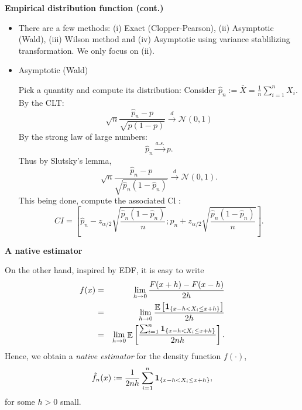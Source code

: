 \documentclass[19pt,landscaoe]{article}
\newcommand{\bone}{{\bf 1}}
\DeclareMathOperator{\E}{\mathbb{E}}
\begin{document}
\newpage
{\LARGE\centerline{\textbf{Empirical distribution function (cont.)}}}
\vskip25pt
    \large 
   
    
    \begin{itemize}
      \item
    There are a few methods: (i) Exact (Clopper-Pearson),
      (ii) Asymptotic (Wald), (iii)  Wilson method and (iv) Asymptotic using variance stablilizing transformation. We only focus on (ii).
    
    \item Asymptotic (Wald)
    
     Pick a quantity and compute its distribution: Consider $\hat{p}_{n}:=\bar{X}=\frac1n\sum_{i=1}^nX_i$. By the CLT:
    $$
    \sqrt{n} \frac{\hat{p}_{n}-p}{\sqrt{p(1-p)}} \stackrel{d}{\rightarrow} \mathcal{N}(0,1)
    $$
    By the strong law of large numbers:
    $$\hat{p}_n \stackrel{a.s.}{\longrightarrow} p.$$
    Thus by Slutsky's lemma,
    $$
    \sqrt{n} \frac{\hat{p}_n-p}{\sqrt{\hat{p}_n\left(1-\hat{p}_n\right)}} \stackrel{d}{\rightarrow} \mathcal{N}(0,1).
    $$
    This being done, compute the associated $\mathrm{Cl}$ :
    $$
    C I=\left[\hat{p}_n-z_{\alpha / 2} \sqrt{\frac{\hat{p}_n\left(1-\hat{p}_n\right)}{n}} ; \hat{p}_n+z_{\alpha / 2} \sqrt{\frac{\hat{p}_n\left(1-\hat{p}_n\right)}{n}}\right].
    $$
    \end{itemize}
    

\newpage
{\LARGE\centerline{\textbf{A native estimator}}}
\vskip25pt
\begin{minipage}{.9\textwidth}
    \Large 
    \vskip 5pt
    On the other hand, inspired by EDF, it is easy to write 
    \begin{eqnarray*}
        f(x)&=&\lim_{h\to0}\frac{F(x+h)-F(x-h)}{2h}\\
        &=&\lim_{h\to0}\frac{\E\left[\bone_{\{x-h<X_i\le x+h\}}\right]}{2h}\\
        &=&\lim_{h\to0}\E\left[\frac{\sum_{i=1}^n\bone_{\{x-h<X_i\le x+h\}}}{2nh}\right].
    \end{eqnarray*}
    Hence, we obtain a {\it native estimator} for the density function $f(\cdot)$, 
\begin{equation}\label{def-nat}
    \hat{f}_n(x):=\frac1{2nh}\sum_{i=1}^n\bone_{\{x-h<X_i\le x+h\}},
\end{equation}
    for some $h>0$ small. 
\end{minipage}
\end{document}
